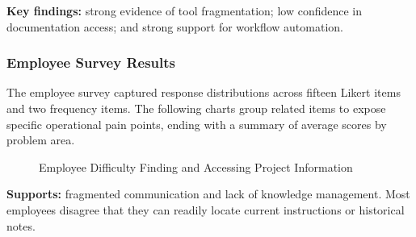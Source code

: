 \documentclass[12pt,a4paper]{report}
\begin{document}
\textbf{Key findings:} strong evidence of tool fragmentation; low confidence in documentation access; and strong support for workflow automation.

\subsubsection{Employee Survey Results}
The employee survey captured response distributions across fifteen Likert items and two frequency items. The following charts group related items to expose specific operational pain points, ending with a summary of average scores by problem area.

\begin{figure}[H]
\centering
{}
\caption{Employee Difficulty Finding and Accessing Project Information}
\label{fig:emp_info}
\end{figure}
\textbf{Supports:} fragmented communication and lack of knowledge management. Most employees disagree that they can readily locate current instructions or historical notes.
\end{document}
